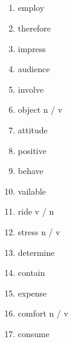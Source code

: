 \documentclass[10pt, a4paper, landscape]{oblivoir}
\begin{document}
\begin{multicols}{3}
    \section{}
    \begin{enumerate}
       \item employ 
       \item therefore 
       \item impress 
       \item audience 
       \item involve 
       \item object  n / v
       \item attitude 
       \item positive 
       \item behave 
       \item vailable 
       \item ride v / n
       \item stress n / v
       \item determine 
       \item contain 
       \item expense 
       \item comfort n / v
       \item consume 

    \end{enumerate}


\end{multicols}
\end{document}
